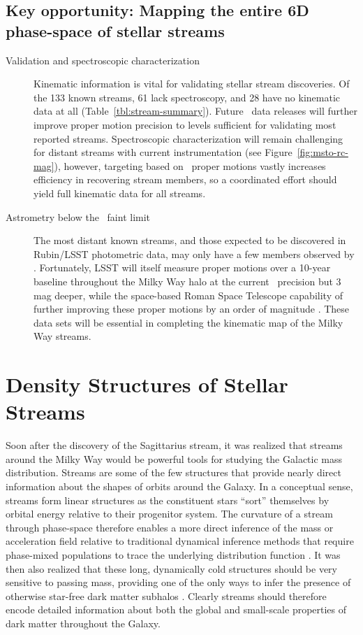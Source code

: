 \documentclass[final,5p,times,twocolumn,authoryear]{elsarticle}
\begin{document}
\subsection{Key opportunity: Mapping the entire 6D phase-space of stellar streams}
\begin{description}
\item[Validation and spectroscopic characterization]{
Kinematic information is vital for validating stellar stream discoveries.
Of the 133 known streams, 61 lack spectroscopy, and 28 have no kinematic data at all (Table~\ref{tbl:stream-summary}).
Future \gaia\ data releases will further improve proper motion precision to levels sufficient for validating most reported streams.
Spectroscopic characterization will remain challenging for distant streams with current instrumentation (see Figure~\ref{fig:msto-rc-mag}), however, targeting based on \gaia\ proper motions vastly increases efficiency in recovering stream members, so a coordinated effort should yield full kinematic data for all streams.
}
\item[Astrometry below the \gaia\ faint limit]{
The most distant known streams, and those expected to be discovered in Rubin/LSST photometric data, may only have a few members observed by \gaia.
Fortunately, LSST will itself measure proper motions over a 10-year baseline throughout the Milky Way halo at the current \gaia\ precision but 3\,mag deeper, while the space-based Roman Space Telescope  capability of further improving these proper motions by an order of magnitude \citep[][]{sanderson:2019}.
These data sets will be essential in completing the kinematic map of the Milky Way streams.
}
\end{description}



\section{Density Structures of Stellar Streams}
\label{sec:structure}

Soon after the discovery of the Sagittarius stream, it was realized that streams around
the Milky Way would be powerful tools for studying the Galactic mass distribution.
Streams are some of the few structures that provide nearly direct information about
the shapes of orbits around the Galaxy.
In a conceptual sense, streams form linear structures as the constituent stars ``sort''
themselves by orbital energy relative to their progenitor system.
The curvature of a stream through phase-space therefore enables a more direct inference
of the mass or acceleration field relative to traditional dynamical inference methods
that require phase-mixed populations to trace the underlying distribution function
\citep{bh:2018}.
It was then also realized that these long, dynamically cold structures should be very
sensitive to passing mass, providing one of the only ways to infer the presence of
otherwise star-free dark matter subhalos \citep{johnston:2002, ibata:2002, carlberg:2009, yoon:2011}.
Clearly streams should therefore encode detailed information about both the global and
small-scale properties of dark matter throughout the Galaxy.
\end{document}
